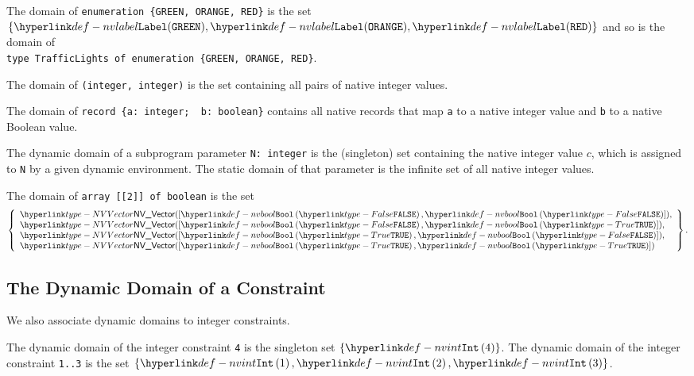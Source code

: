 The domain of \verb|enumeration {GREEN, ORANGE, RED}| is the set \\
$\{\nvlabel(\texttt{GREEN}), \nvlabel(\texttt{ORANGE}), \nvlabel(\texttt{RED})\}$ and so is the domain
of \\
\verb|type TrafficLights of enumeration {GREEN, ORANGE, RED}|.

The domain of \texttt{(integer, integer)} is the set containing all pairs of native integer values.

The domain of \verb|record {a: integer;  b: boolean}| contains all native records
that map \texttt{a} to a native integer value and \texttt{b} to a native Boolean value.

The dynamic domain of a subprogram parameter \texttt{N: integer} is the (singleton) set containing
the native integer value $c$,
which is assigned to \texttt{N} by a given dynamic environment. The static domain of that parameter
is the infinite set of all native integer values.

The domain of \texttt{array [[2]] of boolean} is the set
\[
  \left\{
  \begin{array}{l}
    \NVVector([\nvboolop{\False}, \nvboolop{\False}]),\\
    \NVVector([\nvboolop{\False}, \nvboolop{\True}]),\\
    \NVVector([\nvboolop{\True}, \nvboolop{\False}]),\\
    \NVVector([\nvboolop{\True}, \nvboolop{\True}])
  \end{array}
  \right\}.
\]

\subsection{The Dynamic Domain of a Constraint\label{sec:DynDomainConstraint}}
We also associate dynamic domains to integer constraints.

The dynamic domain of the integer constraint \texttt{4} is the singleton set $\{\nvintop{4}\}$.
%
The dynamic domain of the integer constraint \texttt{1..3} is the set
$\{\nvintop{1}, \nvintop{2}, \nvintop{3}\}$.
